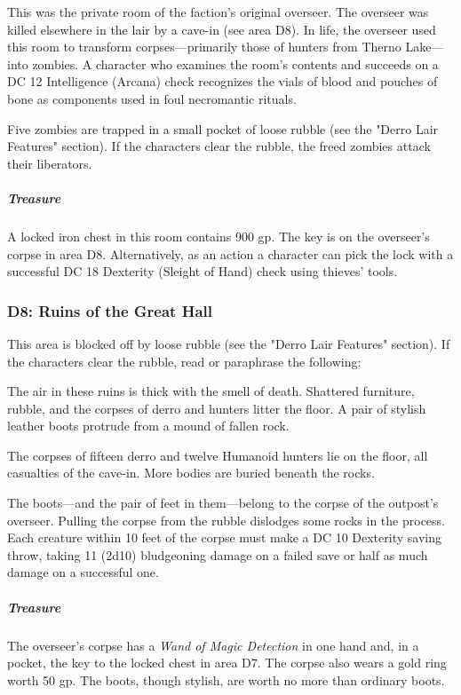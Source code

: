 \documentclass[10pt,a4paper,twoside,bg=print,twocolumn,openany,nodeprecatedcode]{dndbook}
\begin{document}
This was the private room of the faction's original overseer. The overseer was killed elsewhere in the lair by a cave-in (see area D8). In life, the overseer used this room to transform corpses—primarily those of hunters from Therno Lake—into zombies. A character who examines the room's contents and succeeds on a DC 12 Intelligence (Arcana) check recognizes the vials of blood and pouches of bone as components used in foul necromantic rituals.

Five zombies are trapped in a small pocket of loose rubble (see the "Derro Lair Features" section). If the characters clear the rubble, the freed zombies attack their liberators.

\subparagraph{Treasure}
A locked iron chest in this room contains 900 gp. The key is on the overseer's corpse in area D8. Alternatively, as an action a character can pick the lock with a successful DC 18 Dexterity (Sleight of Hand) check using thieves' tools.

\subsubsection{D8: Ruins of the Great Hall}
This area is blocked off by loose rubble (see the "Derro Lair Features" section). If the characters clear the rubble, read or paraphrase the following:

\begin{DndReadAloud}{}
The air in these ruins is thick with the smell of death. Shattered furniture, rubble, and the corpses of derro and hunters litter the floor. A pair of stylish leather boots protrude from a mound of fallen rock.

\end{DndReadAloud}

The corpses of fifteen derro and twelve Humanoid hunters lie on the floor, all casualties of the cave-in. More bodies are buried beneath the rocks.

The boots—and the pair of feet in them—belong to the corpse of the outpost's overseer. Pulling the corpse from the rubble dislodges some rocks in the process. Each creature within 10 feet of the corpse must make a DC 10 Dexterity saving throw, taking 11 (2d10) bludgeoning damage on a failed save or half as much damage on a successful one.

\subparagraph{Treasure}
The overseer's corpse has a \textit{Wand of Magic Detection} in one hand and, in a pocket, the key to the locked chest in area D7. The corpse also wears a gold ring worth 50 gp. The boots, though stylish, are worth no more than ordinary boots.
\end{document}

